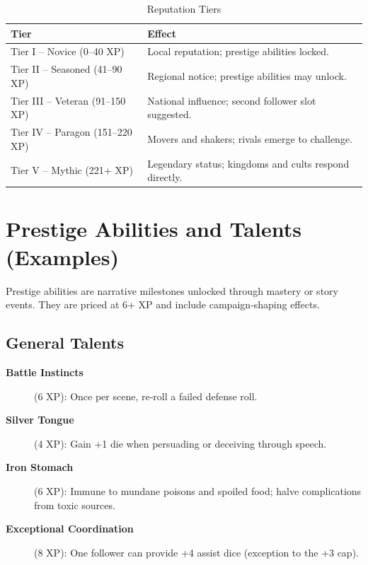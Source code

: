 \begin{longtable}{p{3.5cm} p{9cm}}
\caption{Reputation Tiers}\label{tab:reputation_tiers}\\
\toprule
\textbf{Tier} & \textbf{Effect} \\
\midrule
Tier I -- Novice (0--40 XP) & Local reputation; prestige abilities locked. \\
Tier II -- Seasoned (41--90 XP) & Regional notice; prestige abilities may unlock. \\
Tier III -- Veteran (91--150 XP) & National influence; second follower slot suggested. \\
Tier IV -- Paragon (151--220 XP) & Movers and shakers; rivals emerge to challenge. \\
Tier V -- Mythic (221+ XP) & Legendary status; kingdoms and cults respond directly. \\
\bottomrule
\end{longtable}

\section{Prestige Abilities and Talents (Examples)}\label{sec:prestige_abilities}

Prestige abilities are narrative milestones unlocked through mastery or story events. They are priced at 6+ XP and include campaign‑shaping effects.

\subsection{General Talents}\label{subsec:general_talents}

\begin{description}
    \item[\textbf{Battle Instincts}] (6 XP): Once per scene, re‑roll a failed defense roll.
    \item[\textbf{Silver Tongue}] (4 XP): Gain +1 die when persuading or deceiving through speech.
    \item[\textbf{Iron Stomach}] (6 XP): Immune to mundane poisons and spoiled food; halve complications from toxic sources.
    \item[\textbf{Exceptional Coordination}] (8 XP): One follower can provide +4 assist dice (exception to the +3 cap).
\end{description}

